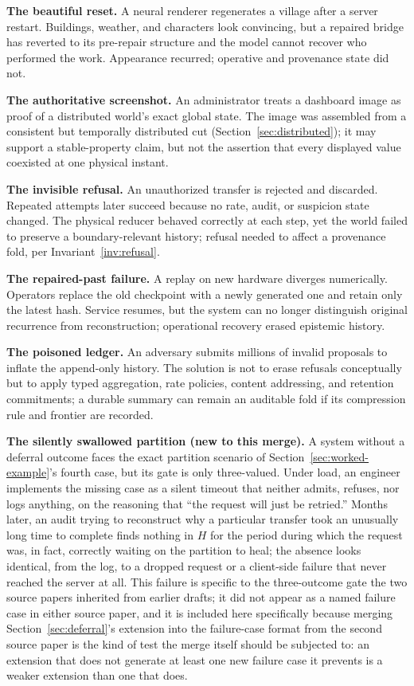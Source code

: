 \documentclass[11pt]{article}
\begin{document}
\textbf{The beautiful reset.} A neural renderer regenerates a village after a server restart. Buildings, weather, and characters look convincing, but a repaired bridge has reverted to its pre-repair structure and the model cannot recover who performed the work. Appearance recurred; operative and provenance state did not.

\textbf{The authoritative screenshot.} An administrator treats a dashboard image as proof of a distributed world's exact global state. The image was assembled from a consistent but temporally distributed cut (Section~\ref{sec:distributed}); it may support a stable-property claim, but not the assertion that every displayed value coexisted at one physical instant.

\textbf{The invisible refusal.} An unauthorized transfer is rejected and discarded. Repeated attempts later succeed because no rate, audit, or suspicion state changed. The physical reducer behaved correctly at each step, yet the world failed to preserve a boundary-relevant history; refusal needed to affect a provenance fold, per Invariant~\ref{inv:refusal}.

\textbf{The repaired-past failure.} A replay on new hardware diverges numerically. Operators replace the old checkpoint with a newly generated one and retain only the latest hash. Service resumes, but the system can no longer distinguish original recurrence from reconstruction; operational recovery erased epistemic history.

\textbf{The poisoned ledger.} An adversary submits millions of invalid proposals to inflate the append-only history. The solution is not to erase refusals conceptually but to apply typed aggregation, rate policies, content addressing, and retention commitments; a durable summary can remain an auditable fold if its compression rule and frontier are recorded.

\textbf{The silently swallowed partition (new to this merge).} A system without a deferral outcome faces the exact partition scenario of Section~\ref{sec:worked-example}'s fourth case, but its gate is only three-valued. Under load, an engineer implements the missing case as a silent timeout that neither admits, refuses, nor logs anything, on the reasoning that ``the request will just be retried.'' Months later, an audit trying to reconstruct why a particular transfer took an unusually long time to complete finds nothing in $H$ for the period during which the request was, in fact, correctly waiting on the partition to heal; the absence looks identical, from the log, to a dropped request or a client-side failure that never reached the server at all. This failure is specific to the three-outcome gate the two source papers inherited from earlier drafts; it did not appear as a named failure case in either source paper, and it is included here specifically because merging Section~\ref{sec:deferral}'s extension into the failure-case format from the second source paper is the kind of test the merge itself should be subjected to: an extension that does not generate at least one new failure case it prevents is a weaker extension than one that does.
\end{document}
